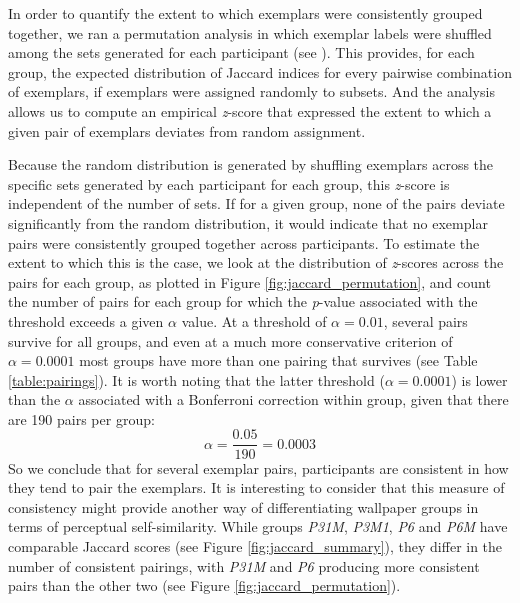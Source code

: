 \documentclass[11pt, twoside]{article}
\begin{document}
In order to quantify the extent to which exemplars were consistently grouped together, we ran a permutation analysis in which exemplar labels were shuffled among the sets generated for each participant (see ). This provides, for each group, the expected distribution of Jaccard indices for every pairwise combination of exemplars, if exemplars were assigned randomly to subsets. And the analysis allows us to compute an empirical \textit{z}-score that expressed the extent to which a given pair of exemplars deviates from random assignment. 

Because the random distribution is generated by shuffling exemplars across the specific sets generated by each participant for each group, this \textit{z}-score is independent of the number of sets. If for a given group, none of the pairs deviate significantly from the random distribution, it would indicate that no exemplar pairs were consistently grouped together across participants. To estimate the extent to which this is the case, we look at the distribution of \textit{z}-scores across the pairs for each group, as plotted in Figure \ref{fig:jaccard_permutation}, and count the number of pairs for each group for which the \textit{p}-value associated with the threshold exceeds a given $\alpha$ value. At a threshold of $\alpha = 0.01$, several pairs survive for all groups, and even at a much more conservative criterion of $\alpha = 0.0001$ most groups have more than one pairing that survives (see Table \ref{table:pairings}). It is worth noting that the latter threshold ($\alpha = 0.0001$) is lower than the $\alpha$ associated with a Bonferroni correction within group, given that there are 190 pairs per group: \[ \alpha = \frac{0.05}{190} = 0.0003 \] So we conclude that for several exemplar pairs, participants are consistent in how they tend to pair the exemplars. It is interesting to consider that this measure of consistency might provide another way of differentiating wallpaper groups in terms of perceptual self-similarity. While groups \textit{P31M}, \textit{P3M1}, \textit{P6} and \textit{P6M} have comparable Jaccard scores (see Figure \ref{fig:jaccard_summary}), they differ in the number of consistent pairings, with \textit{P31M} and \textit{P6} producing more consistent pairs than the other two (see Figure \ref{fig:jaccard_permutation}). 
\end{document}
